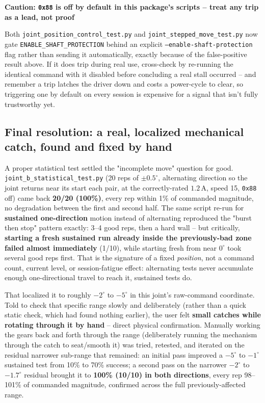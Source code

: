 \documentclass[11pt,letterpaper]{article}
\newenvironment{caution}[1]{%
    \par\addvspace{8pt}%
    \noindent{\color{cautionred}\rule{\linewidth}{0.8pt}}\par\vspace{2pt}
    \noindent\textbf{\color{cautionred}Caution: #1}\par\vspace{2pt}
}{%
    \par\vspace{2pt}\noindent{\color{cautionred}\rule{\linewidth}{0.4pt}}%
    \par\addvspace{8pt}%
}
\begin{document}
\begin{caution}{\texttt{0x88} is off by default in this package's scripts -- treat any trip as a lead, not proof}
Both \texttt{joint\_position\_control\_test.py} and \texttt{joint\_stepped\_move\_test.py} now gate \texttt{ENABLE\_SHAFT\_PROTECTION} behind an explicit \texttt{--enable-shaft-protection} flag rather than sending it automatically, exactly because of the false-positive result above. If it does trip during real use, cross-check by re-running the identical command with it disabled before concluding a real stall occurred -- and remember a trip latches the driver down and costs a power-cycle to clear, so triggering one by default on every session is expensive for a signal that isn't fully trustworthy yet.
\end{caution}

\subsection{Final resolution: a real, localized mechanical catch, found and fixed by hand}
\label{sec:joint-b-resolution}
A proper statistical test settled the "incomplete move" question for good. \texttt{joint\_b\_statistical\_test.py} (20 reps of $\pm0.5^\circ$, alternating direction so the joint returns near its start each pair, at the correctly-rated $1.2$\,A, speed 15, \texttt{0x88} off) came back \textbf{20/20 (100\%)}, every rep within 1\% of commanded magnitude, no degradation between the first and second half. The same script re-run for \textbf{sustained one-direction} motion instead of alternating reproduced the "burst then stop" pattern exactly: 3--4 good reps, then a hard wall -- but critically, \textbf{starting a fresh sustained run already inside the previously-bad zone failed almost immediately} (1/10), while starting fresh from near $0^\circ$ took several good reps first. That is the signature of a fixed \emph{position}, not a command count, current level, or session-fatigue effect: alternating tests never accumulate enough one-directional travel to reach it, sustained tests do.

That localized it to roughly $-2^\circ$ to $-5^\circ$ in this joint's raw-command coordinate. Told to check that specific range slowly and deliberately (rather than a quick static check, which had found nothing earlier), the user felt \textbf{small catches while rotating through it by hand} -- direct physical confirmation. Manually working the gears back and forth through the range (deliberately running the mechanism through the catch to seat/smooth it) was tried, retested, and iterated on the residual narrower sub-range that remained: an initial pass improved a $-5^\circ$ to $-1^\circ$ sustained test from 10\% to 70\% success; a second pass on the narrower $-2^\circ$ to $-1.7^\circ$ residual brought it to \textbf{100\% (10/10) in both directions}, every rep 98--101\% of commanded magnitude, confirmed across the full previously-affected range.
\end{document}

